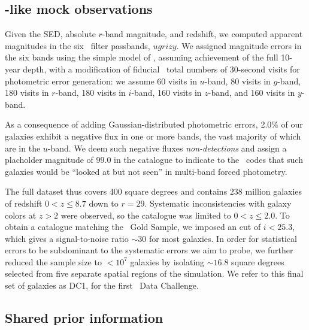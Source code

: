 \subsection{\lsst-like mock observations}

Given the SED, absolute $r$-band magnitude, and redshift, we computed apparent magnitudes in the six \lsst\ filter passbands, $ugrizy$.
We assigned magnitude errors in the six bands using the simple model of \citet{Ivezic:08}, assuming achievement of the full 10-year depth, with a modification of fiducial \lsst\ total numbers of 30-second visits for photometric error generation: we assume 60 visits in $u$-band, 80 visits in $g$-band, 180 visits in $r$-band, 180 visits in $i$-band, 160 visits in $z$-band, and 160 visits in $y$-band.

As a consequence of adding Gaussian-distributed photometric errors, 2.0\% of our galaxies exhibit a negative flux in one or more bands, the vast majority of which are in the $u$-band.
We deem such negative fluxes \textit{non-detections} and assign a placholder magnitude of 99.0 in the catalogue to indicate to the \pzpdf\ codes that such galaxies would be ``looked at but not seen'' in multi-band forced photometry.

The full dataset thus covers $400$ square degrees and contains $238$ million galaxies of redshift $0 < z \leq 8.7$ down to $r = 29$.
Systematic inconsistencies with galaxy colors at $z > 2$ were observed, so the catalogue was limited to $0 < z \leq 2.0$.
To obtain a catalogue matching the \lsst\ Gold Sample, we imposed an cut of $i < 25.3$, which gives a signal-to-noise ratio $\sim 30$ for most galaxies.
In order for statistical errors to be subdominant to the systematic errors we aim to probe, we further reduced the sample size to $<10^{7}$ galaxies by isolating $\sim 16.8$ square degrees selected from five separate spatial regions of the simulation.
We refer to this final set of galaxies as DC1, for the first \desc\ Data Challenge.

\subsection{Shared prior information}

